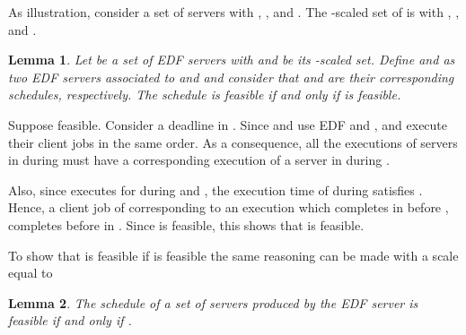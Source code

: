 \documentclass[twocolumn, compsocconf]{IEEEtran}
\newtheorem{lemma}{Lemma}[section]
\begin{document}
As illustration, consider  a set of servers with
, ,  and . The -scaled set of  is  with , , 
and .
  
\begin{lemma}\label{lem:scalingEquiv}
  Let  be a set of EDF servers with  and
   be its -scaled set. Define  and  as two EDF servers
  associated to  and  and consider that  and
   are their corresponding schedules, respectively. The schedule
   is feasible if and only if  is feasible.
\end{lemma}
  
\begin{IEEEproof}
  Suppose  feasible. Consider a deadline  in . Since 
  and  use EDF and ,  and  execute their
  client jobs in the same order. As a consequence, all the executions of servers
  in  during  must have a corresponding execution of a
  server in  during .

  Also, since  executes for  during  and , the execution time  of  during  satisfies
  .  Hence, a client job of  corresponding to an
  execution which completes in  before , completes before  in
  . Since  is feasible, this shows that  is feasible.

  To show that  is feasible if  is feasible the same reasoning
  can be made with a scale equal to 
\end{IEEEproof}

\begin{lemma}\label{lem:edfServSched}
  The schedule of a set of servers  produced by the EDF server  is feasible if and only if .
\end{lemma}
\end{document}
